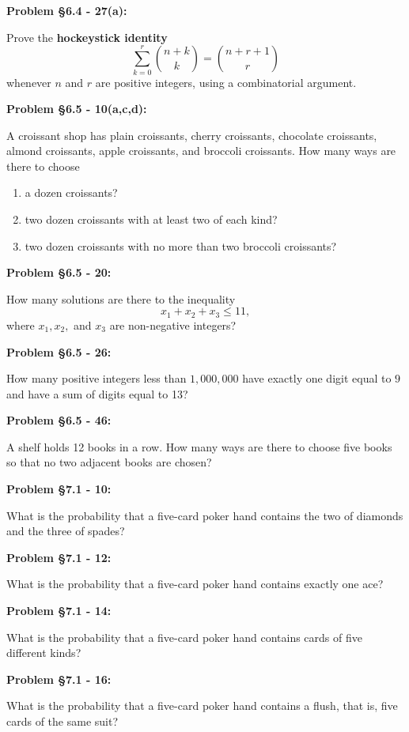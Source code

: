 \documentclass{article}
\newenvironment{problem}[1]
    {\begin{mdframed}[default]
    \textbf{Problem #1:}
    }
    {\end{mdframed}
    }
\begin{document}
\begin{problem}{\S 6.4 - 27(a)}
Prove the \textbf{hockeystick identity}
\[ \sum_{k=0}^r {n+k \choose k} = {n + r + 1 \choose r } \]
whenever $n$ and $r$ are positive integers, using a combinatorial argument.
\end{problem}

\begin{problem}{\S 6.5 - 10(a,c,d)}
A croissant shop has plain croissants, cherry croissants, chocolate croissants, almond croissants, apple croissants, and broccoli croissants. How many ways are there to choose
\begin{enumerate}
    \item[(a)] a dozen croissants?
    \item[(c)] two dozen croissants with at least two of each kind?
    \item[(d)] two dozen croissants with no more than two broccoli croissants?
\end{enumerate}
\end{problem}

\begin{problem}{\S 6.5 - 20}
How many solutions are there to the inequality
\[ x_1 + x_2 + x_3 \leq 11, \]
where $x_1, x_2,$ and $x_3$ are non-negative integers?
\end{problem}

\begin{problem}{\S 6.5 - 26}
How many positive integers less than $1,000,000$ have exactly one digit equal to $9$ and have a sum of digits equal to 13?
\end{problem}

\begin{problem}{\S 6.5 - 46}
A shelf holds 12 books in a row. How many ways are there to choose five books so that no two adjacent books are chosen?
\end{problem}

\begin{problem}{\S 7.1 - 10}
What is the probability that a five-card poker hand contains the two of diamonds and the three of spades?
\end{problem}

\begin{problem}{\S 7.1 - 12}
What is the probability that a five-card poker hand contains exactly one ace?
\end{problem}

\begin{problem}{\S 7.1 - 14}
What is the probability that a five-card poker hand contains cards of five different kinds?
\end{problem}

\begin{problem}{\S 7.1 - 16}
What is the probability that a five-card poker hand contains a flush, that is, five cards of the same suit?
\end{problem}
\end{document}

